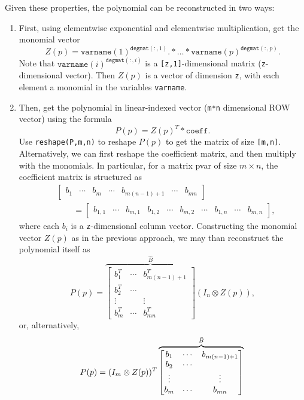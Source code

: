 \documentclass{article}
\newcommand{\bmat}[1]{\begin{bmatrix} #1\end{bmatrix}}
\newcommand{\R}{\mathbb{R}}
\begin{document}
	Given these properties, the polynomial can be reconstructed in two ways:
	\begin{enumerate}
		\item First, using elementwise exponential and elementwise multiplication, get the monomial vector $$Z(p) = \texttt{varname}(1)^{\texttt{degmat}(:,1)}.*\dots*\texttt{varname}(p)^{\texttt{degmat}(:,p)}.$$
		Note that $\texttt{varname}(i)^{\texttt{degmat}(:,i)}$ is a \texttt{[z,1]}-dimensional matrix (\texttt{z}-dimensional vector). Then $Z(p)$ is a vector of dimension \texttt{z}, with each element a monomial in the variables \texttt{varname}.
		
		\item
		Then, get the polynomial in linear-indexed vector (\texttt{m*n} dimensional ROW vector) using the formula
		$$P(p) = Z(p)^T*\texttt{coeff}.$$
		Use \texttt{reshape(P,m,n)} to reshape $P(p)$ to get the matrix of size \texttt{[m,n]}.\\
		
		Alternatively, we can first reshape the coefficient matrix, and then multiply with the monomials. In particular, for a matrix pvar of size $m \times n$, the coefficient matrix is structured as
		\begin{align*}
			&\bmat{b_1 & \cdots &b_m& \cdots &b_{m(n-1)+1}& \cdots & b_{mn}}\\
			&\qquad=\bmat{b_{1,1} & \cdots &b_{m,1}&b_{1,2}& \cdots &b_{m,2}&\cdots&b_{1,n}& \cdots & b_{m,n}},
		\end{align*}
		where each $b_i$ is a \texttt{z}-dimensional column vector.
		Constructing the monomial vector $Z(p)$ as in the previous approach, we may than reconstruct the polynomial itself as
		\[
		P(p)= \overbrace{\bmat{b_1^T & \cdots & b_{m(n-1)+1}^T\\
				b_2^T & \cdots & \\
				\vdots & & \vdots \\
				b_m^T & \cdots & b_{mn}^T}}^{\hat B}(I_n \otimes Z(p)),
		\]
		or, alternatively,
		\[
		P(p)= (I_m \otimes Z(p))^T\overbrace{\bmat{b_1 & \cdots & b_{m(n-1)+1}\\
				b_2 & \cdots & \\
				\vdots & & \vdots \\
				b_m & \cdots & b_{mn}}}^{\bar B}\\
		\]
	\end{enumerate}
\end{document}

